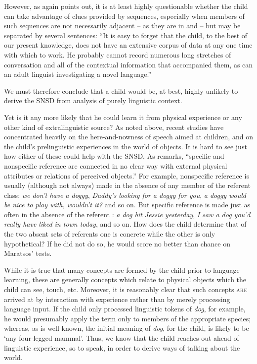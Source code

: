 However, as \citet[95]{Maratsos1976} again points out, it is at least highly questionable whether the child can take advantage of clues provided by sequences, especially when members of such sequences are not necessarily adjacent -- as they are in  and  -- but may be separated by several sentences: ``It is easy to forget that the child, to the best of our present knowledge, does not have an extensive corpus of data at any one time with which to work. He probably cannot record numerous long stretches of conversation and all of the con\-textual information that accompanied them, as can an adult linguist investigating a novel language.''

We must therefore conclude that a child would be, at best, highly unlikely to derive the SNSD from analysis of purely linguistic context.

Yet is it any more likely that he could learn it from physical experience or any other kind of extralinguistic source? As noted above, recent studies have concentrated heavily on the here-and-nowness of speech aimed at children, and on the child's prelinguistic experiences in the world of objects. It is hard to see just how either of these could help with the SNSD. As \citet[94]{Maratsos1976} remarks, ``specific and nonspecific reference are connected in no clear way with external physical attributes or relations of perceived objects.'' For example, nonspecific reference is usually (although not always) made in the absence of any member of the referent class: \textit{we don't have a doggy}, \textit{Daddy's looking for a doggy for you}, \textit{a doggy would be nice to play with, wouldn't it?} and so on. But specific reference is made just as often in the absence of the referent : \textit{a dog bit Jessie yesterday}, \textit{I saw a dog you'd really have liked in town today}, and so on. How does the child determine that of the two absent sets of referents one is concrete while the other is only hypothetical? If he did not do so, he would score no better than chance on Maratsos' tests.


While it is true that many concepts are formed by the child prior to language learning, these are generally concepts which relate to physical objects which the child can see, touch, etc. Moreover, it is reasonably clear that such concepts \textsc{are} arrived at by interaction with experience rather than by merely processing language input. If the child only processed linguistic tokens of \textit{dog}, for example, he would presumably apply the term only to members of the appropriate species; whereas, as is well known, the initial meaning of \textit{dog}, for the child, is likely to be `any four-legged mammal'. Thus, we know that the child reaches out ahead of linguistic experience, so to speak, in order to derive ways of talking about the world.

